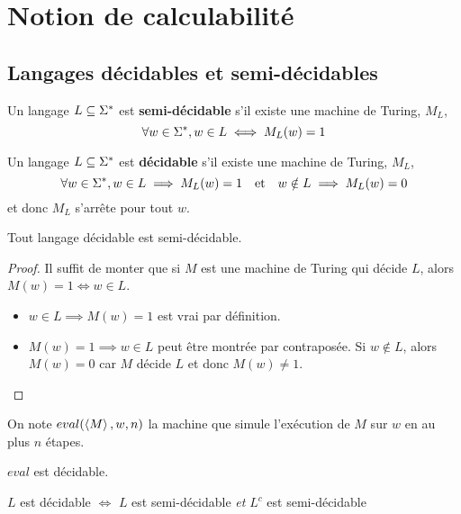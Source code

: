 \section{Notion de calculabilité}


\subsection{Langages décidables et semi-décidables}

\begin{definition}
	Un langage $L \subseteq \Sigma^{*}$ est \textbf{semi-décidable} s'il existe une machine de Turing, $M_L$, \tlq
	$$ \forall w \in \Sigma^{*}, w \in L \iff M_L(w) = 1 $$
\end{definition}

\begin{definition}
	Un langage $L \subseteq \Sigma^{*}$ est \textbf{décidable} s'il existe une machine de Turing, $M_L$, \tlq
	$$ \forall w \in \Sigma^{*}, w \in L \implies M_L(w) = 1 \quad \text{et} \quad w \notin L \implies M_L(w) = 0 $$
	et donc $M_L$ s'arrête pour tout $w$.
\end{definition}

\begin{prop}
	Tout langage décidable est semi-décidable.
\end{prop}

\begin{proof}
	Il suffit de monter que si $M$ est une machine de Turing qui décide $L$, alors $M(w) = 1 \iff w \in L$.
	\begin{itemize}
		\item $w \in L \implies M(w) = 1$ est vrai par définition.
		\item $M(w) = 1 \implies w \in L$ peut être montrée par contraposée. Si $w \notin L$, alors $M(w) = 0$ car $M$ décide $L$ et donc $M(w) \neq 1$.
	\end{itemize}
\end{proof}


\begin{definition}[eval]
	On note $eval(\left\langle M\right\rangle, w, n)$ la machine que simule l'exécution de $M$ sur $w$ en au plus $n$ étapes.
\end{definition}

\begin{prop}[Admis]
	$eval$ est décidable.
\end{prop}

\begin{prop}
	$L$ est décidable $\iff$ $L$ est semi-décidable \emph{et} $L^c$ est semi-décidable
\end{prop}

